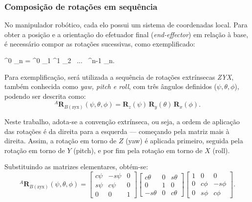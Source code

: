 \subsubsection{Composição de rotações em sequência}
\label{sec:composicao_rotacoes_sequencia}
No manipulador robótico, cada elo possui um sistema de coordenadas local. Para obter a posição e a orientação do efetuador final (\emph{end-effector}) em relação à base, é necessário compor as rotações sucessivas, como exemplificado:

{{}^0 _n =
{}^0 _1
{}^1 _2  \, ... \,
{}^{n-1} _n.}

Para exemplificação, será utilizada a sequência de rotações extrínsecas \emph{ZYX}, também conhecida como \emph{yaw, pitch e roll}, com três ângulos definidos ($\psi,\theta,\phi$), podendo ser descrita como:
\begin{equation}
{}^A \mathbf{R}_{B(\text{zyx})}(\psi,\theta,\phi) = \mathbf{R}_z(\psi)\,\mathbf{R}_y(\theta)\,\mathbf{R}_x(\phi).
\label{eq:rotacao_ZYX1}
\end{equation}

Neste trabalho, adota-se a convenção extrínseca, ou seja, a ordem de aplicação das rotações é da direita para a esquerda — começando pela matriz mais à direita. Assim, a rotação em torno de $Z$ (yaw) é aplicada primeiro, seguida pela rotação em torno de $Y$ (pitch), e por fim pela rotação em torno de $X$ (roll).

Substituindo
as matrizes elementares, obtém-se:
\begin{equation}
    \label{rotacao_ZYX2}
{}^A \mathbf{R}_{B(\text{zyx})}(\psi,\theta,\phi) =
\begin{bmatrix}
c\psi & -s\psi & 0 \\
s\psi &  c\psi & 0 \\
0     &  0     & 1
\end{bmatrix}
\begin{bmatrix}
 c\theta & 0 & s\theta \\
 0       & 1 & 0       \\
-s\theta & 0 & c\theta
\end{bmatrix}
\begin{bmatrix}
1 & 0      & 0       \\
0 & c\phi & -s\phi  \\
0 & s\phi &  c\phi
\end{bmatrix}.
\end{equation}


